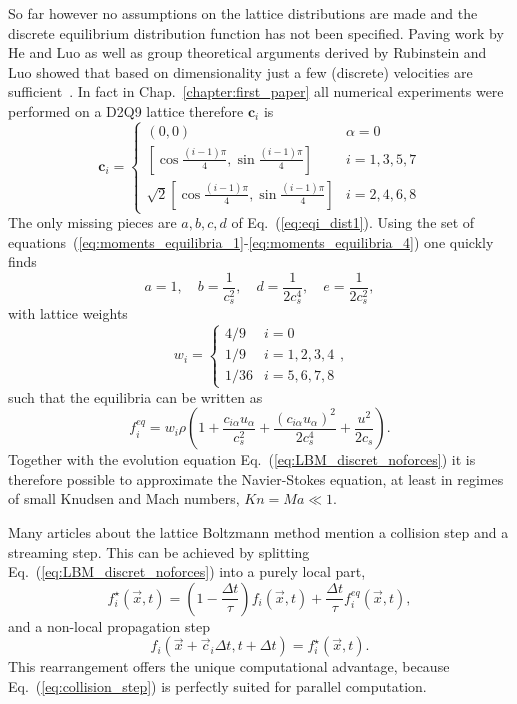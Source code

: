 So far however no assumptions on the lattice distributions are made and the discrete equilibrium distribution function has not been specified.
Paving work by He and Luo as well as group theoretical arguments derived by Rubinstein and Luo showed that based on dimensionality just a few (discrete) velocities are sufficient~\cite{heTheoryLatticeBoltzmann1997, rubinsteinTheoryLatticeBoltzmann2008}.
In fact in Chap.~\ref{chapter:first_paper} all numerical experiments were performed on a D2Q9 lattice therefore $\mathbf{c}_{i}$ is
\begin{equation}\label{eq:speeds_method}
\mathbf{c}_{i}  =
\left\{
\begin{array}{ll}
(0,0) & \alpha = 0 \\
\left[\cos{\frac{(i-1)\pi}{4}}, \sin{\frac{(i-1)\pi}{4}} \right] &  i=1,3,5,7 \\
\sqrt{2}\left[\cos{\frac{(i-1)\pi}{4}}, \sin{\frac{(i-1)\pi}{4}} \right] & i=2,4,6,8
\end{array}
\right.    
\end{equation}
The only missing pieces are $a, b, c, d$ of Eq.~(\ref{eq:eqi_dist1}).
Using the set of equations~(\ref{eq:moments_equilibria_1}-\ref{eq:moments_equilibria_4}) one quickly finds
\begin{equation}
    a = 1,\quad b = \frac{1}{c_s^2},\quad d = \frac{1}{2c_s^4},\quad e = \frac{1}{2c_s^2},
\end{equation}
with lattice weights
\begin{equation}\label{eq:weightsD2Q9_meth}
w_{i} = \begin{cases}
4/9 &\text{$i = 0$}\\
1/9 &\text{$i = 1,2,3,4$}\\
1/36 &\text{$i = 5,6,7,8$}
\end{cases}
,
\end{equation}
such that the equilibria can be written as
\begin{equation}\label{eq:eqi_dist2}
    f_{i}^{eq} = w_{i}\rho\left(1 + \frac{c_{i\alpha} u_{\alpha}}{c_s^2} +  \frac{(c_{i\alpha} u_{\alpha})^2}{2c_s^4} + \frac{u^2}{2c_s}\right).
\end{equation}
Together with the evolution equation Eq.~(\ref{eq:LBM_discret_noforces}) it is therefore possible to approximate the Navier-Stokes equation, at least in regimes of small Knudsen and Mach numbers, $Kn = Ma \ll 1$.

Many articles about the lattice Boltzmann method mention a collision step and a streaming step.
This can be achieved by splitting Eq.~(\ref{eq:LBM_discret_noforces}) into a purely local part, 
\begin{equation}\label{eq:collision_step}
    f^{\star}_i(\vec{x},t) = \left(1-\frac{\Delta t}{\tau}\right)f_i(\vec{x},t) + \frac{\Delta t}{\tau}f_i^{eq}(\vec{x},t),
\end{equation}
and a non-local propagation step
\begin{equation}\label{eq:steaming_step}
    f_i(\vec{x}+\vec{c}_i\Delta t,t + \Delta t) = f^{\star}_i(\vec{x},t).
\end{equation}
This rearrangement offers the unique computational advantage, because Eq.~(\ref{eq:collision_step}) is perfectly suited for parallel computation.

